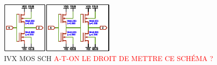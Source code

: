 
\begin{figure}[h]
	\label{ivxbufmos}
	\center
	\includegraphics[width=0.5\textwidth]{./figures/IVX_BUFF_X4_3.pdf}
	\caption{IVX MOS SCH \textcolor{red}{A-T-ON LE DROIT DE METTRE CE SCHÉMA ?}}
\end{figure}
